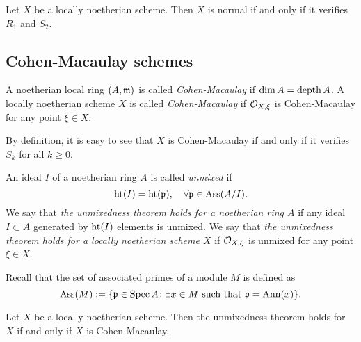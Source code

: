     \begin{theorem}
        Let $X$ be a locally noetherian scheme.
        Then $X$ is normal if and only if it verifies $R_1$ and $S_2$.
    \end{theorem}



\subsection{Cohen-Macaulay schemes}

    \begin{definition}
        A noetherian local ring $(A,{\mathfrak{m}})$ is called \textit{Cohen-Macaulay} if $\dim A = \operatorname{depth} A$.
        A locally noetherian scheme $X$ is called \textit{Cohen-Macaulay} if ${\mathcal{O}}_{X,\xi}$ is Cohen-Macaulay for any point $\xi \in X$.
    \end{definition}

    By definition, it is easy to see that $X$ is Cohen-Macaulay if and only if it verifies $S_k$ for all $k \geq 0$.

    \begin{example}

    \end{example}

    \begin{definition}
        An ideal $I$ of a noetherian ring $A$ is called \textit{unmixed} if 
        \[ \operatorname{ht}(I) = \operatorname{ht}({\mathfrak{p}}), \quad \forall {\mathfrak{p}} \in \operatorname{Ass}(A/I). \]
        We say that \textit{the unmixedness theorem holds for a noetherian ring $A$} if any ideal $I \subset A$ generated by $\operatorname{ht}(I)$ elements is unmixed.
        We say that \textit{the unmixedness theorem holds for a locally noetherian scheme $X$} if ${\mathcal{O}}_{X,\xi}$ is unmixed for any point $\xi \in X$.
    \end{definition}

    \begin{remark}
        Recall that the set of associated primes of a module $M$ is defined as
        \[ \operatorname{Ass}(M) := \{ {\mathfrak{p}} \in \operatorname{Spec} A \colon \exists x \in M \text{ such that } {\mathfrak{p}} = \operatorname{Ann}(x) \}. \] 
        
    \end{remark}

    \begin{theorem}
        Let $X$ be a locally noetherian scheme.
        Then the unmixedness theorem holds for $X$ if and only if $X$ is Cohen-Macaulay.
    \end{theorem}

